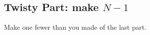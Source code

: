\documentclass[openany]{book}
\newcommand{\ch}{}%
\renewcommand{\sc}{}%
\newcommand{\m}[1]{$\stackrel{{\text{#1}}}{/}$}
\begin{document}

\subsection*{Twisty Part: make $N-1$}
Make one fewer than you made of the last part.
\end{document}

